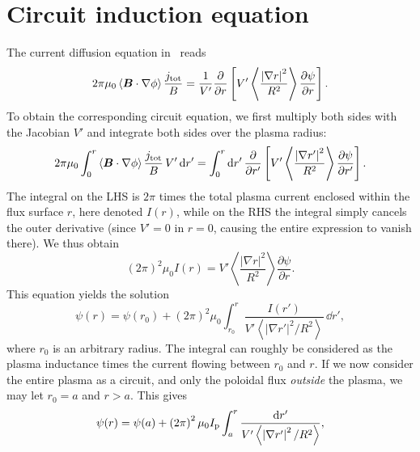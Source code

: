 \documentclass{notes}
\newcommand{\Ip}{I_{\rm p}}
\begin{document}
    \section{Circuit induction equation}\label{app:induction}
    The current diffusion equation in \DREAM\ reads
    \begin{equation}
        2\pi\mu_0\left\langle\boldsymbol{B}\cdot\nabla\phi\right\rangle
        \frac{j_{\rm tot}}{B} = \frac{1}{V'}\frac{\partial}{\partial r}\left[
            V'\left\langle\frac{\left|\nabla r\right|^2}{R^2}\right\rangle
            \frac{\partial\psi}{\partial r}
        \right].
    \end{equation}
    To obtain the corresponding circuit equation, we first multiply both sides
    with the Jacobian $V'$ and integrate both sides over the plasma radius:
    \begin{equation}
        2\pi\mu_0\int_0^r
            \left\langle\boldsymbol{B}\cdot\nabla\phi\right\rangle
            \frac{j_{\rm tot}}{B}\,V'\,\mathrm{d} r'
        =
        \int_0^r\mathrm{d} r'\,\frac{\partial}{\partial r'}\left[
            V'\left\langle\frac{\left|\nabla r'\right|^2}{R^2}\right\rangle
            \frac{\partial\psi}{\partial r'}
        \right].
    \end{equation}
    The integral on the LHS is $2\pi$ times the total plasma current enclosed
    within the flux surface $r$, here denoted $I(r)$, while on the RHS the
    integral simply cancels the outer derivative (since $V' = 0$ in $r=0$,
    causing the entire expression to vanish there). We thus obtain
    \begin{equation}
        \left(2\pi\right)^2\mu_0 I(r) =
        V'\left\langle\frac{\left|\nabla r\right|^2}{R^2}\right\rangle
        \frac{\partial\psi}{\partial r}.
    \end{equation}
    This equation yields the solution
    \begin{equation}
        \psi(r) = \psi\left(r_0\right) + \left(2\pi\right)^2\mu_0\int_{r_0}^r\frac{I(r')}{V'\left\langle\left|\nabla r'\right|^2/R^2\right\rangle}\,\dd r',
    \end{equation}
    where $r_0$ is an arbitrary radius. The integral can roughly be considered
    as the plasma inductance times the current flowing between $r_0$ and $r$.
    If we now consider the entire plasma as a circuit, and only the poloidal
    flux \emph{outside} the plasma, we may let $r_0 = a$ and $r>a$. This gives
    \begin{equation}
        \psi(r) = \psi(a) + \left(2\pi\right)^2\mu_0\Ip\int_a^r\frac{\dd r'}
        {V'\left\langle\left|\nabla r'\right|^2/R^2\right\rangle},
    \end{equation}
\end{document}

